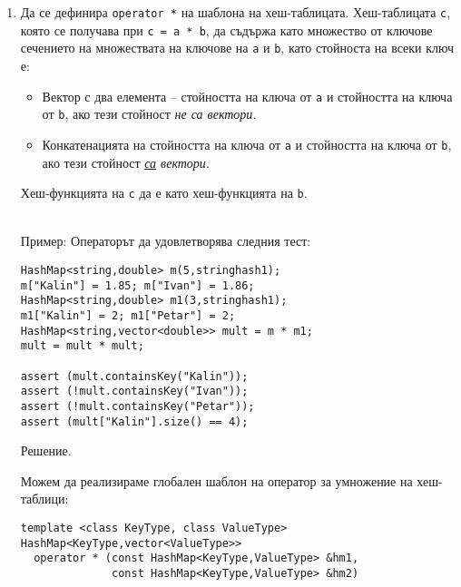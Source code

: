 \documentclass[12pt,a4paper]{article}
\begin{document}
\begin{enumerate}
	\item Да се дефинира \texttt{operator *} на шаблона на хеш-таблицата. Хеш-таблицата \texttt{c}, която се получава при \texttt{c = a * b}, да съдържа като множество от ключове сечението на множествата на ключове на \texttt{a} и \texttt{b}, като стойноста на всеки ключ е:

	\begin{itemize}
		\item Вектор с два елемента -- стойността на ключа от \texttt{a} и стойността на ключа от \texttt{b}, ако тези стойност \emph{не са вектори}.
		\item Конкатенацията на стойността на ключа от \texttt{a} и стойността на ключа от \texttt{b}, ако тези стойност \emph{\underline{са} вектори}.
	\end{itemize}

	Хеш-функцията на \texttt{c} да е като хеш-функцията на \texttt{b}.
	\\
	\\

	\begin{mdframed}[hidealllines=true,backgroundcolor=gray!20]
	Пример: Операторът да удовлетворява следния тест:

\begin{lstlisting}
HashMap<string,double> m(5,stringhash1);
m["Kalin"] = 1.85; m["Ivan"] = 1.86;
HashMap<string,double> m1(3,stringhash1);
m1["Kalin"] = 2; m1["Petar"] = 2;
HashMap<string,vector<double>> mult = m * m1;
mult = mult * mult;

assert (mult.containsKey("Kalin"));
assert (!mult.containsKey("Ivan"));
assert (!mult.containsKey("Petar"));
assert (mult["Kalin"].size() == 4);		
\end{lstlisting}

	\end{mdframed}

	\begin{mdframed}[hidealllines=true,backgroundcolor=gray!20]
	Решение. 

	Можем да реализираме глобален шаблон на оператор за умножение на хеш-таблици:

\begin{verbatim}
template <class KeyType, class ValueType>
HashMap<KeyType,vector<ValueType>> 
  operator * (const HashMap<KeyType,ValueType> &hm1,
              const HashMap<KeyType,ValueType> &hm2)
	
\end{verbatim}


\end{mdframed}
\end{enumerate}
\end{document}
